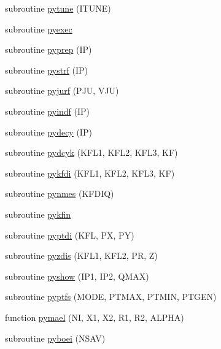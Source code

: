 \begin{DoxyCompactItemize}
\item 
subroutine \hyperlink{pythia-6_84_824_8f_a5093064b30582e5e9082c351ef0d4ffe}{pytune} (I\+T\+U\+N\+E)
\item 
subroutine \hyperlink{pythia-6_84_824_8f_a018da81d5f23cd9c6d55f5151fb0f541}{pyexec}
\item 
subroutine \hyperlink{pythia-6_84_824_8f_aa2fbdb46f28af53ae4a8988b1f8246eb}{pyprep} (I\+P)
\item 
subroutine \hyperlink{pythia-6_84_824_8f_ab14f48c3190aeff08037290931944d07}{pystrf} (I\+P)
\item 
subroutine \hyperlink{pythia-6_84_824_8f_a5fe7258c6d0b84acd97639f5f4d66acd}{pyjurf} (P\+J\+U, V\+J\+U)
\item 
subroutine \hyperlink{pythia-6_84_824_8f_adfef7cf742e4b4fd497224fcccb14869}{pyindf} (I\+P)
\item 
subroutine \hyperlink{pythia-6_84_824_8f_abeadd88d3e040fcaf7b2b6e31108b30e}{pydecy} (I\+P)
\item 
subroutine \hyperlink{pythia-6_84_824_8f_a9c5eaf03cea7f0d97f5783fd071c1409}{pydcyk} (K\+F\+L1, K\+F\+L2, K\+F\+L3, K\+F)
\item 
subroutine \hyperlink{pythia-6_84_824_8f_ab762550f3025c60b2731636ec9577946}{pykfdi} (K\+F\+L1, K\+F\+L2, K\+F\+L3, K\+F)
\item 
subroutine \hyperlink{pythia-6_84_824_8f_a489aaca35db439fe8d6a80cddc152851}{pynmes} (K\+F\+D\+I\+Q)
\item 
subroutine \hyperlink{pythia-6_84_824_8f_a2839a1d21bd6048577c81f57f24a7e41}{pykfin}
\item 
subroutine \hyperlink{pythia-6_84_824_8f_a8f241358dd296a387019d41fb2f9ec46}{pyptdi} (K\+F\+L, P\+X, P\+Y)
\item 
subroutine \hyperlink{pythia-6_84_824_8f_afb341942695f61070b394bd15ac8dc30}{pyzdis} (K\+F\+L1, K\+F\+L2, P\+R, Z)
\item 
subroutine \hyperlink{pythia-6_84_824_8f_a71b2257a4e5d19b7b94b70fee55bea56}{pyshow} (I\+P1, I\+P2, Q\+M\+A\+X)
\item 
subroutine \hyperlink{pythia-6_84_824_8f_a7fce06ff25ae6503bb24f0f3c9b453b3}{pyptfs} (M\+O\+D\+E, P\+T\+M\+A\+X, P\+T\+M\+I\+N, P\+T\+G\+E\+N)
\item 
function \hyperlink{pythia-6_84_824_8f_a77daa748922eb89e9148b8a9f2eebaff}{pymael} (N\+I, X1, X2, R1, R2, A\+L\+P\+H\+A)
\item 
subroutine \hyperlink{pythia-6_84_824_8f_a75d3d9086fc46ac587fe0bdf03c46f63}{pyboei} (N\+S\+A\+V)
\item 

\end{DoxyCompactItemize}
